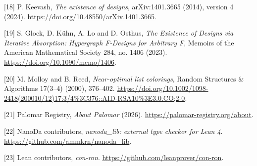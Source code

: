 \documentclass[english,11pt,a4paper]{article}
\begin{document}
{[}18{]} P. Keevash, \emph{The existence of designs}, arXiv:1401.3665 (2014), version 4 (2024). \url{https://doi.org/10.48550/arXiv.1401.3665}.

{[}19{]} S. Glock, D. Kühn, A. Lo and D. Osthus, \emph{The Existence of Designs via Iterative Absorption: Hypergraph F-Designs for Arbitrary F}, Memoirs of the American Mathematical Society 284, no. 1406 (2023). \url{https://doi.org/10.1090/memo/1406}.

{[}20{]} M. Molloy and B. Reed, \emph{Near-optimal list colorings}, Random Structures \& Algorithms 17(3--4) (2000), 376--402. \url{https://doi.org/10.1002/1098-2418(200010/12)17:3/4\%3C376::AID-RSA10\%3E3.0.CO;2-0}.

{[}21{]} Palomar Registry, \emph{About Palomar} (2026). \url{https://palomar-registry.org/about}.

{[}22{]} NanoDa contributors, \emph{nanoda\_lib: external type checker for Lean 4}. \url{https://github.com/ammkrn/nanoda_lib}.

{[}23{]} Lean contributors, \emph{con-ron}. \url{https://github.com/leanprover/con-ron}.

\endgroup
\end{document}
